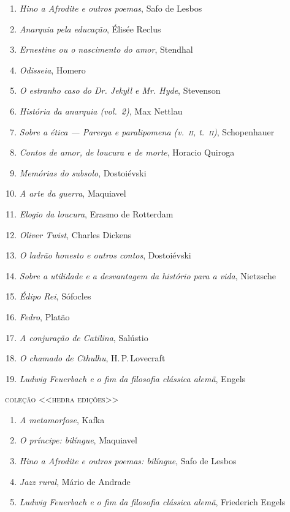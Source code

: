 \begin{enumerate}
\item \textit{Hino a Afrodite e outros poemas}, Safo de Lesbos 
\item \textit{Anarquia pela educação}, Élisée Reclus 
\item \textit{Ernestine ou o nascimento do amor}, Stendhal
\item \textit{Odisseia}, Homero
\item \textit{O estranho caso do Dr. Jekyll e Mr. Hyde}, Stevenson
\item \textit{História da anarquia (vol.~2)}, Max Nettlau
\item \textit{Sobre a ética --- Parerga e paralipomena (v.~\textsc{ii}, t.~\textsc{ii})}, Schopenhauer 
\item \textit{Contos de amor, de loucura e de morte}, Horacio Quiroga
\item \textit{Memórias do subsolo}, Dostoiévski
\item \textit{A arte da guerra}, Maquiavel
\item \textit{Elogio da loucura}, Erasmo de Rotterdam
\item \textit{Oliver Twist}, Charles Dickens
\item \textit{O ladrão honesto e outros contos}, Dostoiévski
\item \textit{Sobre a utilidade e a desvantagem da histório para a vida}, Nietzsche
\item \textit{Édipo Rei}, Sófocles
\item \textit{Fedro}, Platão
\item \textit{A conjuração de Catilina}, Salústio
\item \textit{O chamado de Cthulhu}, H.\,P.\,Lovecraft
\item \textit{Ludwig Feuerbach e o fim da filosofia clássica alemã}, Engels
\end{enumerate}\medskip

{\large\textsc{coleção <<hedra edições>>}}\\

\begin{enumerate}
\setlength\parskip{4.2pt}
\setlength\itemsep{-1.4mm}
\item \textit{A metamorfose}, Kafka
\item \textit{O príncipe: bilíngue}, Maquiavel
\item \textit{Hino a Afrodite e outros poemas: bilíngue}, Safo de Lesbos 
\item \textit{Jazz rural}, Mário de Andrade
\item \textit{Ludwig Feuerbach e o fim da filosofia clássica alemã}, Friederich Engels
\end{enumerate}\medskip

